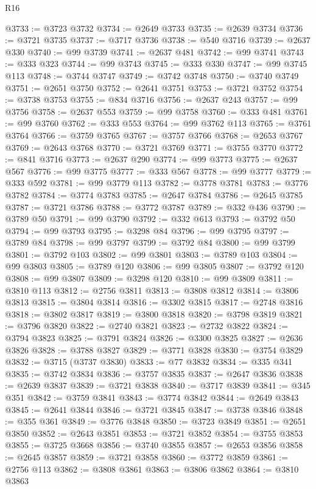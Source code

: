 \begin{lexlean}{R16}
\begin{coremodule}
@3733 := @3723 @3732
@3734 := @2649 @3733
@3735 := @2639 @3734
@3736 := @3721 @3735
@3737 := @3717 @3736
@3738 := @540 @3716
@3739 := @2637 @330
@3740 := @99 @3739
@3741 := @2637 @481
@3742 := @99 @3741
@3743 := @333 @323
@3744 := @99 @3743
@3745 := @333 @330
@3747 := @99 @3745 @113
@3748 := @3744 @3747
@3749 := @3742 @3748
@3750 := @3740 @3749
@3751 := @2651 @3750
@3752 := @2641 @3751
@3753 := @3721 @3752
@3754 := @3738 @3753
@3755 := @834 @3716
@3756 := @2637 @243
@3757 := @99 @3756
@3758 := @2637 @553
@3759 := @99 @3758
@3760 := @333 @481
@3761 := @99 @3760
@3762 := @333 @553
@3764 := @99 @3762 @113
@3765 := @3761 @3764
@3766 := @3759 @3765
@3767 := @3757 @3766
@3768 := @2653 @3767
@3769 := @2643 @3768
@3770 := @3721 @3769
@3771 := @3755 @3770
@3772 := @841 @3716
@3773 := @2637 @290
@3774 := @99 @3773
@3775 := @2637 @567
@3776 := @99 @3775
@3777 := @333 @567
@3778 := @99 @3777
@3779 := @333 @592
@3781 := @99 @3779 @113
@3782 := @3778 @3781
@3783 := @3776 @3782
@3784 := @3774 @3783
@3785 := @2647 @3784
@3786 := @2645 @3785
@3787 := @3721 @3786
@3788 := @3772 @3787
@3789 := @332 @436
@3790 := @3789 @50
@3791 := @99 @3790
@3792 := @332 @613
@3793 := @3792 @50
@3794 := @99 @3793
@3795 := @3298 @84
@3796 := @99 @3795
@3797 := @3789 @84
@3798 := @99 @3797
@3799 := @3792 @84
@3800 := @99 @3799
@3801 := @3792 @103
@3802 := @99 @3801
@3803 := @3789 @103
@3804 := @99 @3803
@3805 := @3789 @120
@3806 := @99 @3805
@3807 := @3792 @120
@3808 := @99 @3807
@3809 := @3298 @120
@3810 := @99 @3809
@3811 := @3810 @113
@3812 := @2756 @3811
@3813 := @3808 @3812
@3814 := @3806 @3813
@3815 := @3804 @3814
@3816 := @3302 @3815
@3817 := @2748 @3816
@3818 := @3802 @3817
@3819 := @3800 @3818
@3820 := @3798 @3819
@3821 := @3796 @3820
@3822 := @2740 @3821
@3823 := @2732 @3822
@3824 := @3794 @3823
@3825 := @3791 @3824
@3826 := @3300 @3825
@3827 := @2636 @3826
@3828 := @3788 @3827
@3829 := @3771 @3828
@3830 := @3754 @3829
@3832 := @3715 (@3737 @3830)
@3833 := @77 @3832
@3834 := @335 @341
@3835 := @3742 @3834
@3836 := @3757 @3835
@3837 := @2647 @3836
@3838 := @2639 @3837
@3839 := @3721 @3838
@3840 := @3717 @3839
@3841 := @345 @351
@3842 := @3759 @3841
@3843 := @3774 @3842
@3844 := @2649 @3843
@3845 := @2641 @3844
@3846 := @3721 @3845
@3847 := @3738 @3846
@3848 := @355 @361
@3849 := @3776 @3848
@3850 := @3723 @3849
@3851 := @2651 @3850
@3852 := @2643 @3851
@3853 := @3721 @3852
@3854 := @3755 @3853
@3855 := @3725 @3668
@3856 := @3740 @3855
@3857 := @2653 @3856
@3858 := @2645 @3857
@3859 := @3721 @3858
@3860 := @3772 @3859
@3861 := @2756 @113
@3862 := @3808 @3861
@3863 := @3806 @3862
@3864 := @3810 @3863

\end{coremodule}
\end{lexlean}
